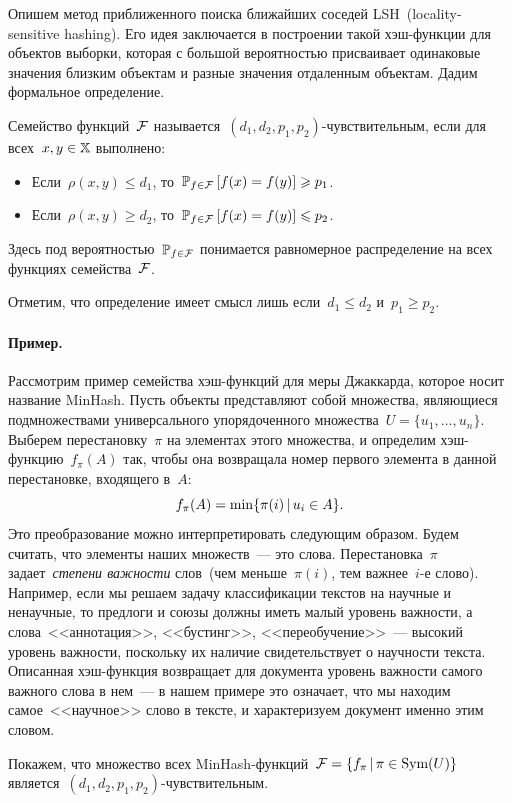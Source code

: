 \documentclass[12pt,fleqn]{article}
\begin{document}
Опишем метод приближенного поиска ближайших соседей LSH~(locality-sensitive hashing).
Его идея заключается в построении такой хэш-функции для объектов выборки,
которая с большой вероятностью присваивает одинаковые значения близким объектам
и разные значения отдаленным объектам.
Дадим формальное определение.
\begin{vkDef}
    Семейство функций~$\mathcal{F}$ называется~$(d_1, d_2, p_1, p_2)$-чувствительным,
    если для всех~$x, y \in \mathbb{X}$ выполнено:
    \begin{itemize}
        \item Если~$\rho(x, y) \leq d_1$, то~$\mathbb{P}_{f \in \mathcal{F}} \left[ f(x) = f(y) \right] \geqslant p_1$.
        \item Если~$\rho(x, y) \geq d_2$, то~$\mathbb{P}_{f \in \mathcal{F}} \left[ f(x) = f(y) \right] \leqslant p_2$.
    \end{itemize}
    Здесь под вероятностью~$\mathbb{P}_{f \in \mathcal{F}}$ понимается равномерное распределение
    на всех функциях семейства~$\mathcal{F}$.
\end{vkDef}
Отметим, что определение имеет смысл лишь если~$d_1 \leq d_2$ и~$p_1 \geq p_2$.

\paragraph{Пример.}
Рассмотрим пример семейства хэш-функций для меры Джаккарда,
которое носит название MinHash.
Пусть объекты представляют собой множества, являющиеся подмножествами
универсального упорядоченного множества~$U = \{u_1, \dots, u_n\}$.
Выберем перестановку~$\pi$ на элементах этого множества,
и определим хэш-функцию~$f_\pi(A)$ так, чтобы она возвращала
номер первого элемента в данной перестановке, входящего в~$A$:
\[
    f_\pi(A) = \min \{\pi(i) \mspace{3mu}{|}\mspace{3mu} u_i \in A \}.
\]
Это преобразование можно интерпретировать следующим образом.
Будем считать, что элементы наших множеств~--- это слова.
Перестановка~$\pi$ задает~\emph{степени важности} слов~(чем меньше~$\pi(i)$,
тем важнее~$i$-е слово).
Например, если мы решаем задачу классификации текстов на научные
и ненаучные, то предлоги и союзы должны иметь малый уровень важности,
а слова~<<аннотация>>, <<бустинг>>, <<переобучение>>~--- высокий уровень важности,
поскольку их наличие свидетельствует о научности текста.
Описанная хэш-функция возвращает для документа уровень важности
самого важного слова в нем~--- в нашем примере это означает,
что мы находим самое~<<научное>> слово в тексте,
и характеризуем документ именно этим словом.

Покажем, что множество всех MinHash-функций~$\mathcal{F} = \{f_\pi \mspace{3mu}{|}\mspace{3mu} \pi \in \text{Sym}(U)\}$
является~$(d_1, d_2, p_1, p_2)$-чувствительным.
\end{document}
